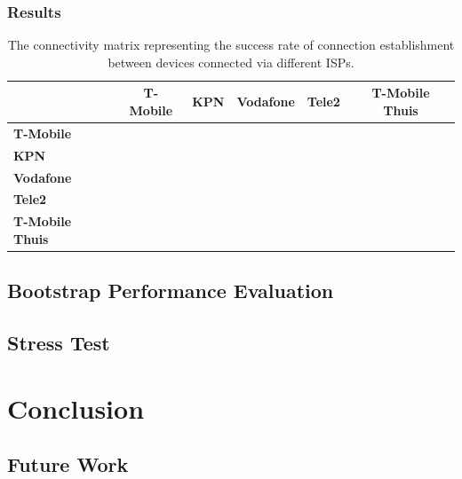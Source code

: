 \subsection{Results}

\begin{table}[h!]
    \centering
    \begin{tabular}{ | l | c | c | c | c | c | }
        \hline
        \textbf{} & \textbf{T-Mobile} & \textbf{KPN} & \textbf{Vodafone} & \textbf{Tele2} & \textbf{T-Mobile Thuis} \\
        \hline
        \textbf{T-Mobile} & \cellcolor{green!25} &  &  &  &  \\
        \hline
        \textbf{KPN} & \cellcolor{green!25}& \cellcolor{green!25} &  &  &  \\
        \hline
        \textbf{Vodafone} & \cellcolor{yellow!25} & \cellcolor{green!25} & \cellcolor{yellow!25} &  &  \\
        \hline
        \textbf{Tele2} & \cellcolor{green!25} & \cellcolor{green!25} & \cellcolor{green!25} & \cellcolor{green!25} & \\
        \hline
        \textbf{T-Mobile Thuis} & \cellcolor{green!25} & \cellcolor{green!25} & \cellcolor{green!25} & \cellcolor{green!25} & \cellcolor{green!25} \\
        \hline
    \end{tabular}
    \caption{The connectivity matrix representing the success rate of connection establishment between devices connected via different ISPs.}
    \label{table_cgnat_analysis}
\end{table}

\section{Bootstrap Performance Evaluation}

\section{Stress Test}



\chapter{Conclusion}

\section{Future Work}
